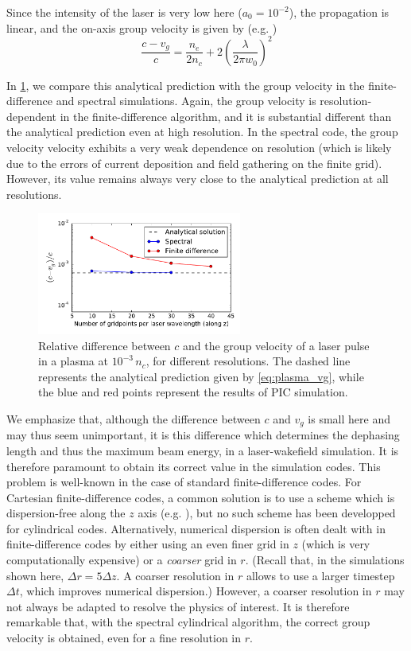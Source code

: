 \documentclass[a4paper]{article}   	%
\begin{document}
Since the intensity of the laser is very low here ($a_0 = 10^{-2}$),
the propagation is linear, and the on-axis group velocity is given by
(e.g. \citep{Esarey1999})
\begin{equation} 
\label{eq:plasma_vg}
\frac{c-v_g}{c} = \frac{n_e}{2n_c} + 2\left( \frac{\lambda}{2\pi w_0} \right)^2
\end{equation}

In \cref{fig:Plasma_vg}, we compare this analytical prediction with the group velocity in the
finite-difference and spectral simulations. Again, the
group velocity is resolution-dependent in the finite-difference
algorithm, and it is substantial different than the analytical
prediction even at high resolution. In the spectral code, the group
velocity velocity exhibits a very weak dependence on resolution
(which is likely due to the errors of current deposition and field
gathering on the finite grid). However, its value remains always very
close to the analytical prediction at all resolutions.

\begin{figure}[!h]
\centering
\includegraphics[width=0.6\textwidth]{figures/Plasma_vg.pdf}
\caption{\label{fig:Plasma_vg}Relative difference between $c$ and the
group velocity of a laser pulse in a plasma at $10^{-3}\,n_c$, for different
resolutions. The dashed line represents
the analytical prediction given by \cref{eq:plasma_vg}, while the blue
and red points represent the results of PIC simulation.}
\end{figure}

We emphasize that, although the difference between $c$ and $v_g$ is
small here and may thus seem unimportant, it is this difference which determines
the dephasing length and thus the
maximum beam energy, in a laser-wakefield simulation. It is therefore
paramount to obtain its correct value in the simulation codes. This
problem is well-known in the case of standard finite-difference
codes. For Cartesian finite-difference codes, a common solution is to
use a scheme which is dispersion-free along the $z$ axis 
(e.g. \citep{Karkkainen,Pukhov,Nuter}), but no such scheme has been
developped for cylindrical codes. Alternatively, numerical dispersion is often 
dealt with in finite-difference codes by either using an even finer grid in
$z$ (which is very computationally expensive) or
a \emph{coarser} grid in $r$. (Recall that, in the simulations shown here, $\Delta r = 5\Delta
z$. A coarser resolution in $r$ allows to
use a larger timestep $\Delta t$, which improves numerical
dispersion.) However, a coarser resolution in $r$ may not always be
adapted to resolve the physics of interest. It is therefore remarkable 
that, with the spectral cylindrical algorithm, the correct group
velocity is obtained, even for a fine resolution in $r$. 
\end{document}
